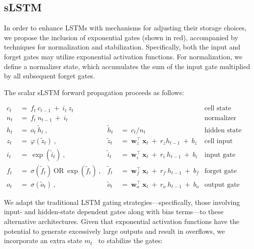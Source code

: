 \subsection{sLSTM}
\label{sec:sLSTM}

In order to enhance LSTMs with mechanisms for adjusting their storage choices, we propose the inclusion of exponential gates (shown in red), accompanied by techniques for normalization and stabilization. Specifically, both the input and forget gates may utilize exponential activation functions. For normalization, we define a normalizer state, which accumulates the sum of the input gate multiplied by all subsequent forget gates.

The scalar sLSTM forward propagation proceeds as follows:

\begin{align}
\label{eq:slstmforward}
c_t \ &= \  f_t \ c_{t-1} \ + \ i_t \ z_t & & 
 &\text{cell state} \\
n_t \ &= \  f_t \ n_{t-1} \ + \ i_t  & & 
 &\text{normalizer state} \\
h_t \ &= \ o_t \ \tilde{h}_t \ ,
  &\tilde{h}_t \ &= \ c_t / n_t
&\text{hidden state} \\
z_t \ &= \ \varphi \left( \tilde{z}_t \right) \ , 
  &\tilde{z}_t \ &=  \ \mathbf{w}^\top_{z} \ \mathbf{x}_t \ + \
  r_{z}  h_{t-1} \ + \  b_{z}
  &\text{cell input} \\
i_t \ &= \ \!\exp \left( \tilde{i}_t  \right) \ , 
  &\tilde{i}_t \ &= \ \mathbf{w}^\top_{i} \ \mathbf{x}_t \ + \
  r_{i}  \ h_{t-1} \ + \  b_{i}
  &\text{input gate} \\
f_t \ &= \ \sigma \left(  \tilde{f}_t \right) \ \text{OR} \
\!\exp \left(  \tilde{f}_t \right) \ ,
  &\tilde{f}_t \ &= \ \mathbf{w}^\top_{f} \ \mathbf{x}_t  \ + \
  r_{f}  \ h_{t-1} \ + \  b_{f}
  &\text{forget gate} \\
o_t \ &= \ \sigma \left( \tilde{o}_t \right) \ , 
  &\tilde{o}_t  \ &= \ \mathbf{w}^\top_{o} \ \mathbf{x}_t \ + \
  r_{o}  \ h_{t-1} \ + \  b_{o}
  &\text{output gate} 
\end{align}

We adapt the traditional LSTM gating strategies—specifically, those involving input- and hidden-state dependent gates along with bias terms—to these alternative architectures. Given that exponential activation functions have the potential to generate excessively large outputs and result in overflows, we incorporate an extra state \mbox{$m_t$~\citep{Milakov:18arxiv}} to stabilize the gates:

